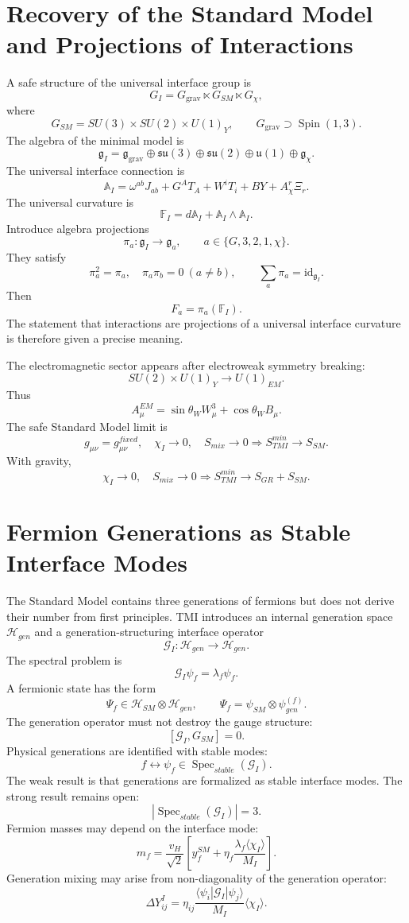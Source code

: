 \documentclass[12pt,a4paper]{article}
\DeclareMathOperator{\Spin}{Spin}
\DeclareMathOperator{\Spec}{Spec}
\newcommand{\Hilb}{\mathcal H}
\newcommand{\Acal}{\mathbb A_I}
\newcommand{\Fcal}{\mathbb F_I}
\begin{document}
\section{Recovery of the Standard Model and Projections of Interactions}
A safe structure of the universal interface group is
\[
\boxed{G_I=G_{\mathrm{grav}}\ltimes G_{SM}\ltimes G_\chi,}
\]
where
\[
\boxed{G_{SM}=SU(3)\times SU(2)\times U(1)_Y,
\qquad G_{\mathrm{grav}}\supset\Spin(1,3).}
\]
The algebra of the minimal model is
\[
\boxed{\mathfrak g_I=\mathfrak g_{\mathrm{grav}}\oplus\mathfrak{su}(3)\oplus\mathfrak{su}(2)\oplus\mathfrak u(1)\oplus\mathfrak g_\chi.}
\]
The universal interface connection is
\[
\boxed{\Acal=\omega^{ab}J_{ab}+G^AT_A+W^iT_i+BY+A_\chi^r\Xi_r.}
\]
The universal curvature is
\[
\boxed{\Fcal=d\Acal+\Acal\wedge\Acal.}
\]
Introduce algebra projections
\[
\boxed{\pi_a:\mathfrak g_I\to\mathfrak g_a,
\qquad a\in\{G,3,2,1,\chi\}.}
\]
They satisfy
\[
\boxed{\pi_a^2=\pi_a,
\quad \pi_a\pi_b=0\ (a\ne b),
\qquad \sum_a\pi_a=\mathrm{id}_{\mathfrak g_I}.}
\]
Then
\[
\boxed{F_a=\pi_a(\Fcal).}
\]
The statement that interactions are projections of a universal interface curvature is therefore given a precise meaning.

The electromagnetic sector appears after electroweak symmetry breaking:
\[
\boxed{SU(2)\times U(1)_Y\to U(1)_{EM}.}
\]
Thus
\[
\boxed{A_\mu^{EM}=\sin\theta_W W_\mu^3+\cos\theta_WB_\mu.}
\]
The safe Standard Model limit is
\[
\boxed{g_{\mu\nu}=g_{\mu\nu}^{fixed},\quad \chi_I\to0,
\quad S_{mix}\to0\Rightarrow S_{TMI}^{min}\to S_{SM}.}
\]
With gravity,
\[
\boxed{\chi_I\to0,
\quad S_{mix}\to0\Rightarrow S_{TMI}^{min}\to S_{GR}+S_{SM}.}
\]

\section{Fermion Generations as Stable Interface Modes}
The Standard Model contains three generations of fermions but does not derive their number from first principles. TMI introduces an internal generation space $\Hilb_{gen}$ and a generation-structuring interface operator
\[
\boxed{\mathcal G_I:\Hilb_{gen}\to\Hilb_{gen}.}
\]
The spectral problem is
\[
\boxed{\mathcal G_I\psi_f=\lambda_f\psi_f.}
\]
A fermionic state has the form
\[
\boxed{\Psi_f\in\Hilb_{SM}\otimes\Hilb_{gen},
\qquad \Psi_f=\psi_{SM}\otimes\psi_{gen}^{(f)}.}
\]
The generation operator must not destroy the gauge structure:
\[
\boxed{[\mathcal G_I,G_{SM}]=0.}
\]
Physical generations are identified with stable modes:
\[
\boxed{f\leftrightarrow\psi_f\in\Spec_{stable}(\mathcal G_I).}
\]
The weak result is that generations are formalized as stable interface modes. The strong result remains open:
\[
\boxed{|\Spec_{stable}(\mathcal G_I)|=3.}
\]
Fermion masses may depend on the interface mode:
\[
\boxed{m_f=\frac{v_H}{\sqrt2}\left[y_f^{SM}+\eta_f\frac{\lambda_f\langle\chi_I\rangle}{M_I}\right].}
\]
Generation mixing may arise from non-diagonality of the generation operator:
\[
\boxed{\Delta Y_{ij}^{I}=\eta_{ij}\frac{\langle\psi_i|\mathcal G_I|\psi_j\rangle}{M_I}\langle\chi_I\rangle.}
\]
\end{document}
